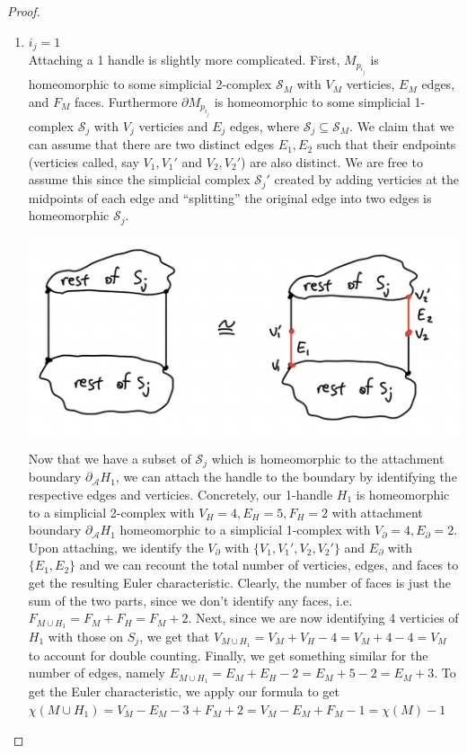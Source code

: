 \documentclass[12pt]{article}
\newcommand{\cA}{{\mathcal A}}
\newcommand{\cS}{{\mathcal S}}
\theoremstyle{definition}
\begin{document}
\begin{proof}
\begin{enumerate}
            \item $i_j = 1$\\
            Attaching a 1 handle is slightly more complicated. First, $M_{p_{i_j}}$ is homeomorphic to some simplicial 2-complex $\cS_M$ with $V_M$ verticies, $E_M$ edges, and $F_M$ faces. Furthermore $\partial M_{p_{i_j}}$ is homeomorphic to some simplicial 1-complex $\cS_j$ with $V_j$ verticies and $E_j$ edges, where $\cS_j \subseteq \cS_M$. We claim that we can assume that there are two distinct edges $E_1, E_2$ such that their endpoints (verticies called, say $V_1, V_1'$ and $V_2,V_2'$) are also distinct. We are free to assume this since the simplicial complex $\cS_j'$ created by adding verticies at the midpoints of each edge and ``splitting'' the original edge into two edges is homeomorphic $\cS_j$. 
            \begin{center}
                  \includegraphics[scale = 0.7]{sim.png}
            \end{center}
            Now that we have a subset of $\cS_j$ which is homeomorphic to the attachment boundary $\partial_\cA H_1$, we can attach the handle to the boundary by identifying the respective edges and verticies. Concretely, our 1-handle $H_1$ is homeomorphic to a simplicial 2-complex with $V_H = 4, E_H = 5, F_H = 2$ with attachment boundary $\partial_\cA H_1$ homeomorphic to a simplicial 1-complex with $V_\partial = 4, E_\partial = 2$. Upon attaching, we identify the $V_\partial$ with $\{V_1,V_1',V_2,V_2'\}$ and $E_\partial$ with $\{E_1,E_2\}$ and we can recount the total number of verticies, edges, and faces to get the resulting Euler characteristic. Clearly, the number of faces is just the sum of the two parts, since we don't identify any faces, i.e. $F_{M\cup H_1} = F_M + F_H = F_M + 2$. Next, since we are now identifying 4 verticies of $H_1$ with those on $S_j$, we get that $V_{M\cup H_1} = V_M + V_H - 4 = V_M + 4 - 4 = V_M$ to account for double counting. Finally, we get something similar for the number of edges, namely $E_{M\cup H_1} = E_M + E_H - 2 = E_M + 5 - 2 = E_M + 3$. To get the Euler characteristic, we apply our formula to get $\chi(M \cup H_1) = V_M - E_M - 3 + F_M + 2 = V_M - E_M+ F_M -1 = \chi(M)-1$
            


\end{enumerate}
\end{proof}
\end{document}
